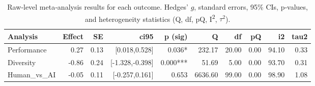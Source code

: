\begin{table}[ht]
\centering
\begin{tabular}{lrrrrrrrrr}
  \toprule
Analysis & Effect & SE & ci95 & p (sig) & Q & df & pQ & i2 & tau2 \\ 
  \midrule
Performance & 0.27 & 0.13 & [0.018,0.528] & 0.036* & 232.17 & 20.00 & 0.00 & 94.10 & 0.33 \\ 
  Diversity & -0.86 & 0.24 & [-1.328,-0.398] & 0.000*** & 51.69 & 5.00 & 0.00 & 93.70 & 0.31 \\ 
  Human_vs_AI & -0.05 & 0.11 & [-0.257,0.161] & 0.653 & 6636.60 & 99.00 & 0.00 & 98.90 & 1.08 \\ 
   \bottomrule
\end{tabular}
\caption{Raw‐level meta‐analysis results for each outcome. Hedges’ $g$, standard errors, 95\% CIs, p‐values, and heterogeneity statistics (Q, df, pQ, I\textsuperscript{2}, $\tau^2$).} 
\label{tab:meta_raw}
\end{table}
